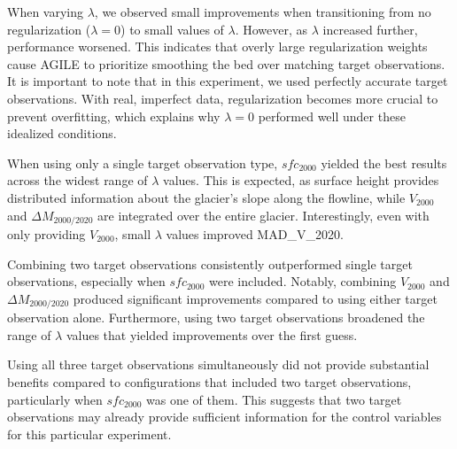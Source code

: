 \documentclass[journal abbreviation, manuscript]{copernicus}
\begin{document}
When varying $\lambda$, we observed small improvements when transitioning from no regularization ($\lambda = 0$) to small values of $\lambda$. However, as $\lambda$ increased further, performance worsened. This indicates that overly large regularization weights cause AGILE to prioritize smoothing the bed over matching target observations. It is important to note that in this experiment, we used perfectly accurate target observations. With real, imperfect data, regularization becomes more crucial to prevent overfitting, which explains why $\lambda = 0$ performed well under these idealized conditions.

When using only a single target observation type, $sfc_{2000}$ yielded the best results across the widest range of $\lambda$ values. This is expected, as surface height provides distributed information about the glacier's slope along the flowline, while $V_{2000}$ and $\Delta M_{2000/2020}$ are integrated over the entire glacier. Interestingly, even with only providing $V_{2000}$, small $\lambda$ values improved MAD\_V\_2020.

Combining two target observations consistently outperformed single target observations, especially when $sfc_{2000}$ were included. Notably, combining $V_{2000}$ and $\Delta M_{2000/2020}$ produced significant improvements compared to using either target observation alone. Furthermore, using two target observations broadened the range of $\lambda$ values that yielded improvements over the first guess.

Using all three target observations simultaneously did not provide substantial benefits compared to configurations that included two target observations, particularly when $sfc_{2000}$ was one of them. This suggests that two target observations may already provide sufficient information for the control variables for this particular experiment.
\end{document}
